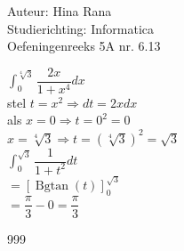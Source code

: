 \documentclass[a4paper]{article}
\newcommand{\dint}{\displaystyle\int}
\begin{document}
\noindent \large Auteur: Hina Rana \\
\noindent \large Studierichting: Informatica\\
\noindent \large Oefeningenreeks 5A nr. 6.13\\

\medskip

\normalsize

$ \dint_{0}^{\sqrt[4]{3}} \dfrac{2x}{1+x^4} dx $ \\

stel $t = x^2 \Rightarrow dt = 2x dx $ \\

als  $ x = 0 \Rightarrow t = 0^2 = 0 $ \\

$ x = \sqrt[4]{3} \Rightarrow t = (\sqrt[4]{3})^2 = \sqrt{3} $ \\

$ \int_{0}^{\sqrt{3}} \dfrac{1}{1+t^2} dt $ \\

$ = \left[\operatorname{Bgtan}(t) \right]_{0}^{\sqrt{3}} $ \\

$ = \dfrac{\pi}{3} - 0 = \dfrac{\pi}{3} $ \\

\begin{thebibliography}{999}
\end{thebibliography}
\end{document}
